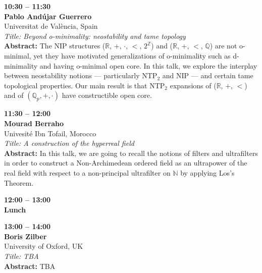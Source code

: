 \documentclass[10pt,a4paper]{article}
\begin{document}
\begin{tcolorbox}[talkbox]
\textbf{10:30 -- 11:30} \\
\textbf{Pablo Andújar Guerrero} \\
Universitat de València, Spain \\
\textit{Title: Beyond o-minimality: neostability and tame topology} \\
\textbf{Abstract:} The NIP structures ($\mathbb{R}$, $+$, $\cdot$, $<$, $2^\mathbb{Z}$) and ($\mathbb{R}$, $+$, $<$, $\mathbb{Q}$) are not o-minimal, yet they have motivated generalizations of o-minimality such as d-minimality and having o-minimal open core. In this talk, we explore the interplay between neostability notions --- particularly NTP$_2$ and NIP --- and certain tame topological properties. Our main result is that NTP$_2$ expansions of ($\mathbb{R}$, $+$, $<$) and of $(\mathbb{Q}_p, +, \cdot)$ have constructible open core.
\end{tcolorbox}

\begin{tcolorbox}[talkbox]
\textbf{11:30 -- 12:00} \\
\textbf{Mourad Berraho} \\
Univesité Ibn Tofail, Morocco \\
\textit{Title: A construction of the hyperreal field} \\
\textbf{Abstract:} In this talk, we are going to recall the notions of filters and ultrafilters in order to construct a Non-Archimedean ordered field as an ultrapower of the real field with respect to a non-principal ultrafilter on $\mathbb{N}$ by applying Los’s Theorem.
\end{tcolorbox}

\begin{tcolorbox}[talkbox]
\textbf{12:00 -- 13:00} \\
\textbf{Lunch}
\end{tcolorbox}

\begin{tcolorbox}[talkbox]
\textbf{13:00 -- 14:00} \\
\textbf{Boris Zilber} \\
University of Oxford, UK \\
\textit{Title: TBA} \\
\textbf{Abstract:} TBA
\end{tcolorbox}
\end{document}
